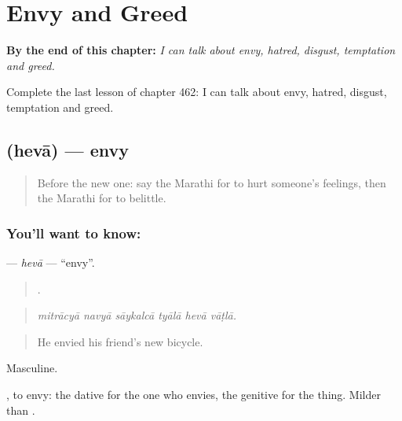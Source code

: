 
\chapter{Envy and Greed}
\label{ch:mr-envy-and-greed}

\begin{chapteropening}
\textbf{By the end of this chapter:} \emph{I can talk about envy, hatred, disgust, temptation and greed.}

Complete the last lesson of chapter 462: I can talk about envy, hatred, disgust, temptation and greed.
\end{chapteropening}

\section[\texorpdfstring{\mr{हेवा} (hevā)}{हेवा (hevā)}]{ (hevā) — envy}

\label{lesson:MR-C462-heva}



\begin{quote}
Before the new one: say the Marathi for to hurt someone's feelings, then the Marathi for to belittle.
\end{quote}

\subsection*{You'll want to know: }
\textbf{} — \emph{hevā} — \textquotedblleft{}envy\textquotedblright{}.

\begin{quote}
     .
\end{quote}

\begin{quote}
\emph{mitrācyā navyā sāykalcā tyālā hevā vāṭlā.}
\end{quote}

\begin{quote}
He envied his friend's new bicycle.
\end{quote}

Masculine.

 , to envy: the dative for the one who envies, the genitive for the thing. Milder than .


